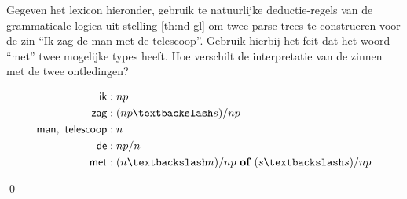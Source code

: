 \begin{example}\label{ex:grammar}
  Gegeven het lexicon hieronder, gebruik te natuurlijke deductie-regels van de grammaticale logica uit stelling \ref{th:nd-gl} om twee parse trees te construeren voor de zin \enquote{Ik zag de man met de telescoop}. Gebruik hierbij het feit dat het woord \enquote{met} twee mogelijke types heeft. Hoe verschilt de interpretatie van de zinnen met de twee ontledingen?

\begin{align*}
  \textsf{ik} &: np \\
  \textsf{zag} &: (np \textbackslash s) / np \\
  \textsf{man},\ \textsf{telescoop} &: n \\
  \textsf{de} &: np / n \\
  \textsf{met} &: (n \textbackslash n) / np  \text{ \bf of } (s \textbackslash s) / np \\
\end{align*}

\begin{wprooftree}

\end{wprooftree}
\hfill\qed

\begin{wprooftree}


\end{wprooftree}
\end{example}
